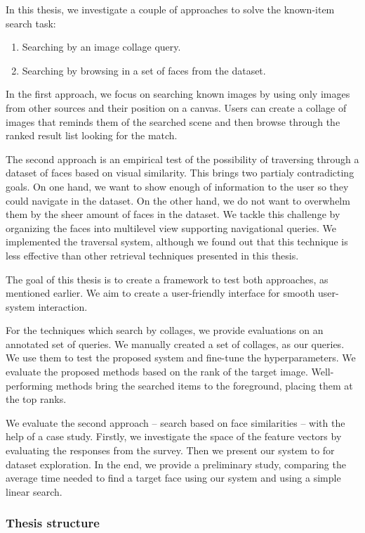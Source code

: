 In this thesis, we investigate a couple of approaches to solve the known-item search task:

\begin{enumerate}
  \item Searching by an image collage query.
  \item Searching by browsing in a set of faces from the dataset.
\end{enumerate}

In the first approach, we focus on searching known images by using only images from other sources and their position on a canvas. Users can create a collage of images that reminds them of the searched scene and then browse through the ranked result list looking for the match.

The second approach is an empirical test of the possibility of traversing through a dataset of faces based on visual similarity. This brings two partialy contradicting goals. On one hand, we want to show enough of information to the user so they could navigate in the dataset. On the other hand, we do not want to overwhelm them by the sheer amount of faces in the dataset. We tackle this challenge by organizing the faces into multilevel view supporting navigational queries. We implemented the traversal system, although we found out that this technique is less effective than other retrieval techniques presented in this thesis.

The goal of this thesis is to create a framework to test both approaches, as mentioned earlier. We aim to create a user-friendly interface for smooth user-system interaction.

For the techniques which search by collages, we provide evaluations on an annotated set of queries. We manually created a set of collages, as our queries. We use them to test the proposed system and fine-tune the hyperparameters. We evaluate the proposed methods based on the rank of the target image. Well-performing methods bring the searched items to the foreground, placing them at the top ranks.

We evaluate the second approach -- search based on face similarities -- with the help of a case study. Firstly, we investigate the space of the feature vectors by evaluating the responses from the survey. Then we present our system to for dataset exploration. In the end, we provide a preliminary study, comparing the average time needed to find a target face using our system and using a simple linear search.

\subsubsection*{Thesis structure}

